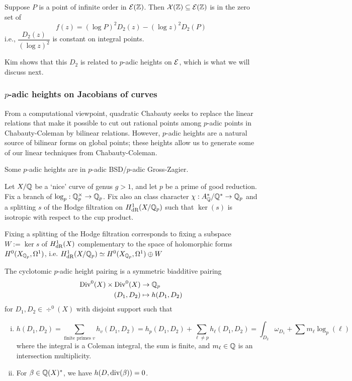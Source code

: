 \begin{thm}
Suppose $P$ is a point of infinite order in $\mathcal{E}(\mathbb{Z})$. Then $\mathcal{X}(\mathbb{Z}) \subseteq \mathcal{E}(\mathbb{Z})$ is in the zero set of
	\[
	f(z)= (\log P)^2 D_2(z) - (\log z)^2 D_2(P)
	\]
i.e., $\dfrac{D_2(z)}{(\log z)^2}$ is constant on integral points. 
\end{thm}


Kim shows that this $D_2$ is related to $p$-adic heights on $\mathcal{E}$, which is what we will discuss next. 



\subsubsection{$p$-adic heights on Jacobians of curves}

From a computational viewpoint, quadratic Chabauty seeks to replace the linear relations that make it possible to cut out rational points among $p$-adic points in Chabauty-Coleman by bilinear relations. However, $p$-adic heights are a natural source of bilinear forms on global points; these heights allow us to generate some of our linear techniques from Chabauty-Coleman.


\begin{rem}
Some $p$-adic heights are in $p$-adic BSD/$p$-adic Gross-Zagier.
\end{rem}


Let $X/\mathbb{Q}$ be a `nice' curve of genus $g>1$, and let $p$ be a prime of good reduction. Fix a branch of $\log_p: \mathbb{Q}_p^\times \to \mathbb{Q}_p$. Fix also an \idele class character $\chi: A_{\mathbb{Q}}^*/\mathbb{Q}^* \to \mathbb{Q}_p$ and a splitting $s$ of the Hodge filtration on $H_{\text{dR}}^1(X/\mathbb{Q}_p)$ such that $\ker(s)$ is isotropic with respect to the cup product. 


\begin{rem}
Fixing a splitting of the Hodge filtration corresponds to fixing a subspace $W:= \ker s$ of $H^1_{\text{dR}}(X)$ complementary to the space of holomorphic forms $H^0(X_{\mathbb{Q}_p},\Omega^1)$, i.e. $H^1_{\text{dR}}(X/\mathbb{Q}_p) \simeq H^0(X_{\mathbb{Q}_p},\Omega^1) \oplus W$
\end{rem}


\begin{dfn}
The cyclotomic $p$-adic height pairing is a symmetric biadditive pairing
	\[
	\begin{aligned}
	\operatorname{Div}^0(X) \times \operatorname{Div}^0(X) &\to \mathbb{Q}_p \\
	(D_1,D_2) &\mapsto h(D_1,D_2)
	\end{aligned}
	\]
for $D_1,D_2 \in \div^0(X)$ with disjoint support such that

\begin{enumerate}[(i)]
\item 
	\[
	h(D_1,D_2)= \sum_{\text{finite primes }v} h_v (D_1,D_2)= h_p(D_1,D_2) + \sum_{\ell \neq p} h_\ell (D_1,D_2)= \int_{D_2} \omega_{D_1} + \sum m_\ell \log_p (\ell)
	\]
where the integral is a Coleman integral, the sum is finite, and $m_\ell \in \mathbb{Q}$ is an intersection multiplicity. 
\item For $\beta \in \mathbb{Q}(X)^*$, we have $h(D,\text{div}(\beta))=0$.
\end{enumerate}
\end{dfn}


